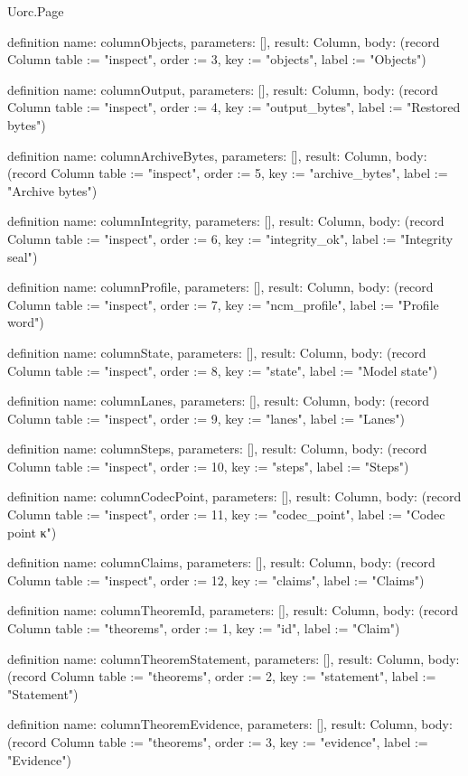 \begin{lexlean}{Uorc.Page}
\begin{semanticmodule}
definition{
  name: columnObjects,
  parameters: [],
  result: Column,
  body: (record Column {table := "inspect", order := 3, key := "objects", label := "Objects"})
}

definition{
  name: columnOutput,
  parameters: [],
  result: Column,
  body: (record Column {table := "inspect", order := 4, key := "output_bytes", label := "Restored bytes"})
}

definition{
  name: columnArchiveBytes,
  parameters: [],
  result: Column,
  body: (record Column {table := "inspect", order := 5, key := "archive_bytes", label := "Archive bytes"})
}

definition{
  name: columnIntegrity,
  parameters: [],
  result: Column,
  body: (record Column {table := "inspect", order := 6, key := "integrity_ok", label := "Integrity seal"})
}

definition{
  name: columnProfile,
  parameters: [],
  result: Column,
  body: (record Column {table := "inspect", order := 7, key := "ncm_profile", label := "Profile word"})
}

definition{
  name: columnState,
  parameters: [],
  result: Column,
  body: (record Column {table := "inspect", order := 8, key := "state", label := "Model state"})
}

definition{
  name: columnLanes,
  parameters: [],
  result: Column,
  body: (record Column {table := "inspect", order := 9, key := "lanes", label := "Lanes"})
}

definition{
  name: columnSteps,
  parameters: [],
  result: Column,
  body: (record Column {table := "inspect", order := 10, key := "steps", label := "Steps"})
}

definition{
  name: columnCodecPoint,
  parameters: [],
  result: Column,
  body: (record Column {table := "inspect", order := 11, key := "codec_point", label := "Codec point κ"})
}

definition{
  name: columnClaims,
  parameters: [],
  result: Column,
  body: (record Column {table := "inspect", order := 12, key := "claims", label := "Claims"})
}

definition{
  name: columnTheoremId,
  parameters: [],
  result: Column,
  body: (record Column {table := "theorems", order := 1, key := "id", label := "Claim"})
}

definition{
  name: columnTheoremStatement,
  parameters: [],
  result: Column,
  body: (record Column {table := "theorems", order := 2, key := "statement", label := "Statement"})
}

definition{
  name: columnTheoremEvidence,
  parameters: [],
  result: Column,
  body: (record Column {table := "theorems", order := 3, key := "evidence", label := "Evidence"})
}


\end{semanticmodule}
\end{lexlean}
